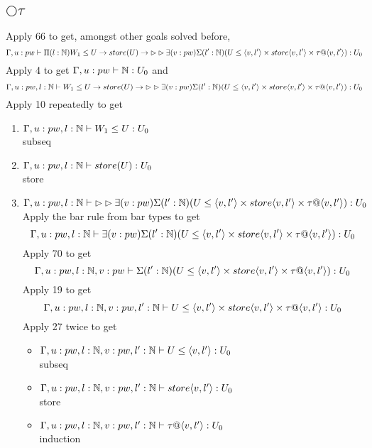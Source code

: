 \message{ !name(paper.tex)}\documentclass{article}
\begin{document}
    \subsection{$\bigcirc \tau$}
    Apply 66 to get, amongst other goals solved before,
    \[\Gamma, u: pw \vdash \Pi(l : \mathbb{N}) W_1 \leq U \rightarrow store(U) \rightarrow \rhd \rhd \exists(v: pw)\Sigma(l' : \mathbb{N})(U \leq \langle v, l' \rangle \times store\langle v, l' \rangle \times \tau @ \langle v, l' \rangle): U_0 \]
    Apply 4 to get $ \Gamma, u: pw \vdash \mathbb{N} : U_0$ and 
    \[\Gamma, u: pw, l : \mathbb{N} \vdash W_1 \leq U \rightarrow store(U) \rightarrow \rhd \rhd \exists(v: pw)\Sigma(l' : \mathbb{N})(U \leq \langle v, l' \rangle \times store\langle v, l' \rangle \times \tau @ \langle v, l' \rangle): U_0\]
   Apply 10 repeatedly to get
   \begin{enumerate}
       \item $\Gamma, u: pw, l : \mathbb{N} \vdash W_1 \leq U : U
       _0$\\
       subseq
       \item $\Gamma, u: pw, l : \mathbb{N} \vdash store(U) : U_0$\\
       store
       \item $\Gamma, u: pw, l : \mathbb{N} \vdash \rhd \rhd \exists(v: pw)\Sigma(l' : \mathbb{N})(U \leq \langle v, l' \rangle \times store\langle v, l' \rangle \times \tau @ \langle v, l' \rangle) : U_0$\\
       Apply the bar rule from bar types to get
       \[\Gamma, u: pw, l : \mathbb{N} \vdash  \exists(v: pw)\Sigma(l' : \mathbb{N})(U \leq \langle v, l' \rangle \times store\langle v, l' \rangle \times \tau @ \langle v, l' \rangle) : U_0\]
       Apply 70 to get 
       \[\Gamma, u: pw, l : \mathbb{N} , v: pw \vdash \Sigma(l' : \mathbb{N})(U \leq \langle v, l' \rangle \times store\langle v, l' \rangle \times \tau @ \langle v, l' \rangle) : U_0\]
       Apply 19 to get
        \[\Gamma, u: pw, l : \mathbb{N} , v: pw , l' : \mathbb{N} \vdash U \leq \langle v, l' \rangle \times store\langle v, l' \rangle \times \tau @ \langle v, l' \rangle : U_0\]
        Apply 27 twice to get
        \begin{itemize}
            \item  $\Gamma, u: pw, l : \mathbb{N} , v: pw , l' : \mathbb{N} \vdash U \leq \langle v, l' \rangle : U_0$\\
            subseq
            \item $\Gamma, u: pw, l : \mathbb{N} , v: pw , l' : \mathbb{N} \vdash store\langle v, l' \rangle : U_0$ \\
            store
            \item $\Gamma, u: pw, l : \mathbb{N} , v: pw , l' : \mathbb{N} \vdash \tau @ \langle v, l' \rangle : U_0$\\
            induction
        \end{itemize}
        

\end{enumerate}
\end{document}
